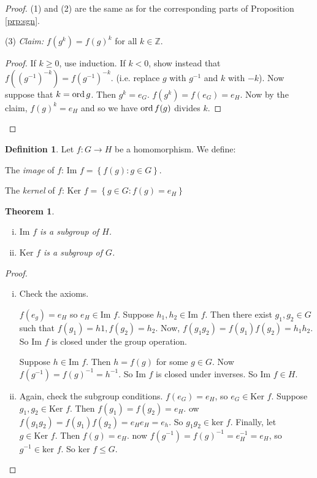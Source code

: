 \documentclass{article}
\newtheorem{theorem}{Theorem}
\theoremstyle{definition} \newtheorem*{definition}{Definition}
\begin{document}
\begin{proof} (1) and (2) are the same as for the corresponding parts of
  Proposition \ref{prp:sgn}.

  (3) \emph{Claim:} $f(g^k)=f(g)^k$ for all $k\in \mathbb{Z}.$ \begin{proof} If
    $k \geq 0$, use induction. If $k<0$, show instead that $f\left( \left(
    g^{-1} \right)^{-k} \right)=f(g^{-1})^{-k}$. (i.e. replace $g$ with
    $g^{-1}$ and $k$ with $-k$). Now suppose that $k=\operatorname{\text{ord}} g$. Then $g^k = e_G$.
    $f(g^k)=f(e_G)=e_H$. Now by the claim, $f(g)^k=e_H$ and so we have $\operatorname{\text{ord}}
    f(g)$ divides $k$.  \end{proof} \end{proof}

\begin{definition} Let $f:G \rightarrow H$ be a homomorphism. We define: 
  
  The \emph{image} of $f$: $\text{Im } f = \left\{ f(g) : g \in G \right\}$.

  The \emph{kernel} of $f$: $\text{Ker } f=\left\{ g \in G : f(g) = e_H
  \right\}$\\ \end{definition}

\begin{theorem}\hfill \begin{enumerate}[(i)] \item $\text{Im } f$ is a subgroup of
        $H$.  \item $\text{Ker } f$ is a subgroup of $G$.  \end{enumerate}
      \label{} \end{theorem}

\begin{proof}\hfill \begin{enumerate}[(i)] \item Check the axioms.

      $f(e_g)=e_H$ so $e_H \in \text{Im }f$.  Suppose $h_1, h_2 \in \text{Im }
      f$. Then there exist $g_1, g_2 \in G$ such that $f(g_1)=h1, f(g_2)=h_2$.
      Now, $f(g_1 g_2)=f(g_1)f(g_2)=h_1 h_2$. So $\text{Im }f$ is closed under
      the group operation.

      Suppose $h \in \text{Im }f. $ Then $h=f(g)$ for some $g \in G$. Now
      $f(g^{-1})=f(g)^{-1}=h^{-1}$. So $\text{Im }f$ is closed under inverses.
      So $\text{Im } f \in H $.

    \item Again, check the subgroup conditions.  $f(e_G)=e_H$, so $e_G \in
      \text{Ker }f$. Suppose $g_1, g_2 \in \text{Ker }f$. Then
      $f(g_1)=f(g_2)=e_H$. ow $f(g_1 g_2)=f(g_1)f(g_2)=e_He_H=e_h$. So $g_1 g_2
      \in \text{ker }f$. Finally, let $g \in \text{Ker }f$. Then $f(g)=e_H$.
      now $f(g^{-1})=f(g)^{-1}=e_H^{-1}=e_H$, so $g^{-1} \in \text{ker }f$. So
      $\text{ker }f \leq G$.  \end{enumerate} \end{proof}
\end{document}
